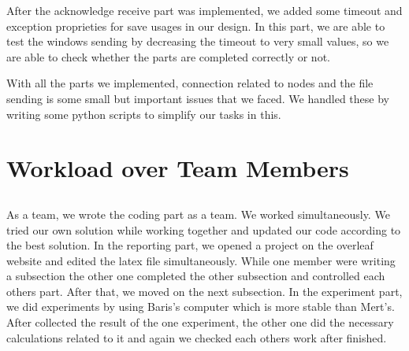 \documentclass[conference]{IEEEtran}
\begin{document}
After the acknowledge receive part was implemented, we added some timeout and exception proprieties for save usages in our design. In this part, we are able to test the windows sending by decreasing the timeout to very small values, so we are able to check whether the parts are completed correctly or not. 

With all the parts we implemented, connection related to nodes and the file sending is some small but important issues that we faced. We handled these by writing some python scripts to simplify our tasks in this.

\section*{Workload over Team Members}

\subsection*{}

As a team, we wrote the coding part as a team. We worked simultaneously. We tried our own solution while working together and updated our code according to the best solution. In the reporting part, we opened a project on the overleaf website and edited the latex file simultaneously. While one member were writing a subsection the other one completed the other subsection and controlled each others part. After that, we moved on the next subsection. In the experiment part, we did experiments by using Baris's computer which is more stable than Mert's. After collected the result of the one experiment, the other one did the necessary calculations related to it and again we checked each others work after finished.  
\end{document}
